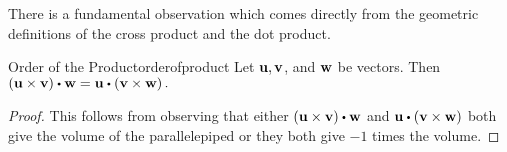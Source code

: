 There is a fundamental observation which comes directly from the geometric
definitions of the cross product and the dot product.

\begin{proposition}{Order of the Product}{orderofproduct}
Let ${\bf u},{\bf v}$, and ${\bf w}$ be vectors. Then $\left(
\vect{u}\times \vect{v}\right) \dotprod \vect{w}=\vect{u}\dotprod \left( \vect{v}\times \vect{w}
\right) .$
\end{proposition}

\begin{proof}This follows from observing that either 
$\left( \vect{u}\times \vect{v}\right) \dotprod \vect{w}$ and $\vect{u}\dotprod 
\left( \vect{v}\times \vect{w}\right) $ both give the volume of the parallelepiped or they both
give $-1$ times the volume.
\end{proof}

